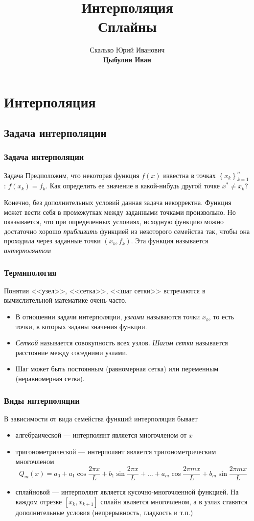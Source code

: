 \documentclass[aspectratio=169,unicode]{beamer}
\title[Интерполяция. Сплайны]{Интерполяция\\Сплайны}
\author[Цыбулин Иван]{Скалько Юрий Иванович\\
\textbf{Цыбулин Иван}}
\date{}
\begin{document}
\begin{frame}[plain]
\titlepage
\end{frame}

\section{Интерполяция}
\subsection{Задача интерполяции}
\begin{frame}
\frametitle{Задача интерполяции}
	\begin{block}{Задача}
	Предположим, что некоторая функция $f(x)$ известна в точках
	$\left\{ x_k \right\}_{k=1}^n$: $f(x_k) = f_k$.
	Как определить ее значение в какой-нибудь другой точке $x^* \neq x_k$?
	\end{block}
	\pause

	Конечно, без дополнительных условий данная задача некорректна. Функция может вести себя
	в промежутках между заданными точками произвольно. Но оказывается, что при определенных условиях,
	исходную функцию можно достаточно хорошо \emph{приблизить} функцией из некоторого семейства так,
	чтобы она проходила через заданные точки $(x_k, f_k)$. Эта функция называется \emph{интерполянтом}
\end{frame}

\begin{frame}
\frametitle{Терминология}
	Понятия <<узел>>, <<сетка>>, <<шаг сетки>> встречаются в вычислительной математике очень часто.
	\begin{itemize}
	\item В отношении задачи интерполяции, \emph{узлами} называются точки $x_k$,
	то есть точки, в которых заданы значения функции.
	\item \emph{Сеткой} называется совокупность всех узлов.
	\emph{Шагом сетки} называется расстояние между соседними узлами.
	\item Шаг может быть постоянным (равномерная сетка) или переменным (неравномерная сетка).
	\end{itemize}
\end{frame}

\begin{frame}
\frametitle{Виды интерполяции}
	В зависимости от вида семейства функций интерполяция бывает
	\begin{itemize}
		\item алгебраической --- интерполянт является многочленом от $x$
		\pause
		\item {тригонометрической --- интерполянт является тригонометрическим многочленом
		\[
			Q_m(x) =
			a_0 + a_1 \cos \frac{2\pi x}{L} + b_1 \sin \frac{2\pi x}{L} + \dots +
			a_m \cos \frac{2\pi mx}{L} + b_m \sin \frac{2\pi mx}{L}
		\]}
		\pause
		\item сплайновой --- интерполянт является кусочно-многочленной функцией. На каждом отрезке $[x_k, x_{k+1}]$ сплайн является многочленом, а
		в узлах ставятся дополнительные условия (непрерывность, гладкость и т.п.)
	\end{itemize}
\end{frame}
\end{document}
